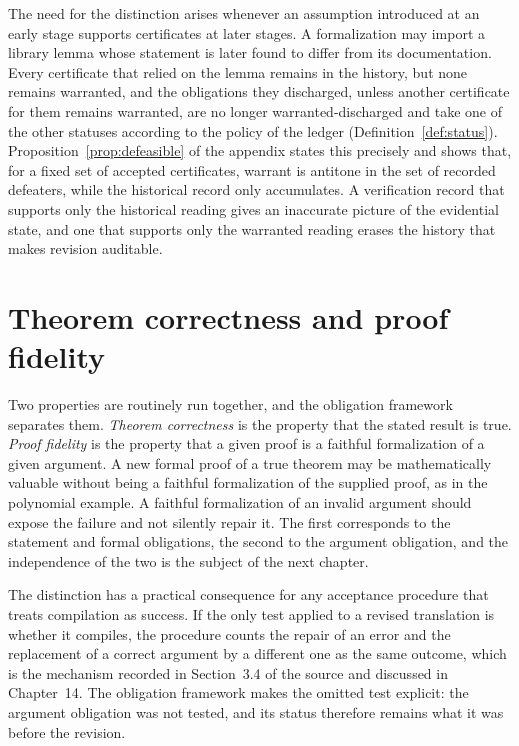 The need for the distinction arises whenever an assumption introduced at an early stage supports certificates at later stages. A formalization may import a library lemma whose statement is later found to differ from its documentation. Every certificate that relied on the lemma remains in the history, but none remains warranted, and the obligations they discharged, unless another certificate for them remains warranted, are no longer warranted-discharged and take one of the other statuses according to the policy of the ledger (Definition~\ref{def:status}). Proposition~\ref{prop:defeasible} of the appendix states this precisely and shows that, for a fixed set of accepted certificates, warrant is antitone in the set of recorded defeaters, while the historical record only accumulates. A verification record that supports only the historical reading gives an inaccurate picture of the evidential state, and one that supports only the warranted reading erases the history that makes revision auditable.

\section{Theorem correctness and proof fidelity}

Two properties are routinely run together, and the obligation framework separates them. \emph{Theorem correctness} is the property that the stated result is true. \emph{Proof fidelity} is the property that a given proof is a faithful formalization of a given argument. A new formal proof of a true theorem may be mathematically valuable without being a faithful formalization of the supplied proof, as in the polynomial example. A faithful formalization of an invalid argument should expose the failure and not silently repair it. The first corresponds to the statement and formal obligations, the second to the argument obligation, and the independence of the two is the subject of the next chapter.

The distinction has a practical consequence for any acceptance procedure that treats compilation as success. If the only test applied to a revised translation is whether it compiles, the procedure counts the repair of an error and the replacement of a correct argument by a different one as the same outcome, which is the mechanism recorded in Section~3.4 of the source and discussed in Chapter~14. The obligation framework makes the omitted test explicit: the argument obligation was not tested, and its status therefore remains what it was before the revision.
